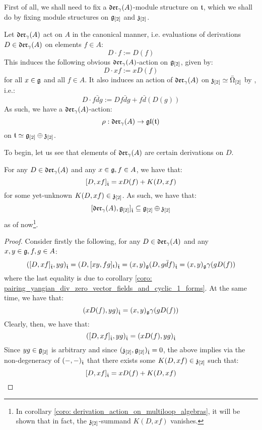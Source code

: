         First of all, we shall need to fix a $\mathfrak{der}_{\gamma}(A)$-module structure on $\mathfrak{t}$, which we shall do by fixing module structures on $\mathfrak{g}_{[2]}$ and $\mathfrak{z}_{[2]}$.
        \begin{convention}
            Let $\mathfrak{der}_{\gamma}(A)$ act on $A$ in the canonical manner, i.e. evaluations of derivations $D \in \mathfrak{der}_{\gamma}(A)$ on elements $f \in A$:
                $$D \cdot f := D(f)$$
            This induces the following obvious $\mathfrak{der}_{\gamma}(A)$-action on $\mathfrak{g}_{[2]}$, given by:
                $$D \cdot xf := x D(f)$$
            for all $x \in \mathfrak{g}$ and all $f \in A$. It also induces an action of $\mathfrak{der}_{\gamma}(A)$ on $\mathfrak{z}_{[2]} \simeq \bar{\Omega}_{[2]}$ by , i.e.:
                $$D \cdot f\bar{d}g := Df \bar{d}g + f \bar{d}(D(g))$$
            As such, we have a $\mathfrak{der}_{\gamma}(A)$-action:
                $$\rho: \mathfrak{der}_{\gamma}(A) \to \mathfrak{gl}(\mathfrak{t})$$
            on $\mathfrak{t} \simeq \mathfrak{g}_{[2]} \oplus \mathfrak{z}_{[2]}$.
        \end{convention}

        To begin, let us see that elements of $\mathfrak{der}_{\gamma}(A)$ are certain derivations on $D$.
        \begin{lemma} \label{lemma: derivation_action_on_multiloop_algebras}
            For any $D \in \mathfrak{der}_{\gamma}(A)$ and any $x \in \mathfrak{g}, f \in A$, we have that:
                $$[D, xf]_{\hat{\mathfrak{t}}} = x D(f) + K( D, xf )$$
            for some yet-unknown $K( D, xf ) \in \mathfrak{z}_{[2]}$. As such, we have that:
                $$[\mathfrak{der}_{\gamma}(A), \mathfrak{g}_{[2]}]_{\hat{\mathfrak{t}}} \subseteq \mathfrak{g}_{[2]} \oplus \mathfrak{z}_{[2]}$$
            as of now\footnote{In corollary \ref{coro: derivation_action_on_multiloop_algebras}, it will be shown that in fact, the $\mathfrak{z}_{[2]}$-summand $K( D, xf )$ vanishes.}.
        \end{lemma}
            \begin{proof}
                Consider firstly the following, for any $D \in \mathfrak{der}_{\gamma}(A)$ and any $x, y \in \mathfrak{g}, f, g \in A$:
                    $$( [D, xf]_{\hat{\mathfrak{t}}}, yg )_{\hat{\mathfrak{t}}} = ( D, [xy, fg]_{\mathfrak{t}} )_{\hat{\mathfrak{t}}} = (x, y)_{\mathfrak{g}} ( D, g\bar{d}f )_{\hat{\mathfrak{t}}} = (x, y)_{\mathfrak{g}} \gamma( g D(f) )$$
                where the last equality is due to corollary \ref{coro: pairing_yangian_div_zero_vector_fields_and_cyclic_1_forms}. At the same time, we have that:
                    $$( x D(f), yg )_{\hat{\mathfrak{t}}} = (x, y)_{\mathfrak{g}} \gamma( g D(f) )$$
                Clearly, then, we have that:
                    $$( [D, xf]_{\hat{\mathfrak{t}}}, yg )_{\hat{\mathfrak{t}}} = ( x D(f), yg )_{\hat{\mathfrak{t}}}$$
                Since $yg \in \mathfrak{g}_{[2]}$ is arbitrary and since $(\mathfrak{z}_{[2]}, \mathfrak{g}_{[2]})_{\hat{\mathfrak{t}}} = 0$, the above implies via the non-degeneracy of $(-, -)_{\hat{\mathfrak{t}}}$ that there exists some $K(D, xf) \in \mathfrak{z}_{[2]}$ such that:
                    $$[D, xf]_{\hat{\mathfrak{t}}} = x D(f) + K(D, xf)$$
            \end{proof}
    
